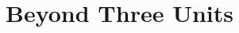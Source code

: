 \documentclass[a4paper,10pt]{article}
\begin{document}
% 
% 
% 
% 
% 
% 
% 
% 
% 


\appendix

\section{Beyond Three Units}
\end{document}
